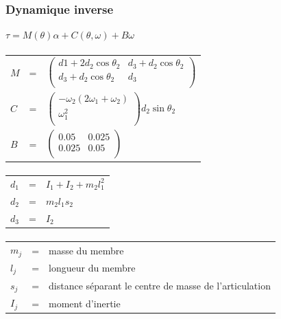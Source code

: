 \documentclass[pdftex,a4paper,11pt]{article}
\begin{document}
\subsubsection{Dynamique inverse}
$\tau = M(\theta)\alpha + C(\theta, \omega) + B\omega $

\paragraph{}
\begin{tabular}{lcl}
    $M$ & = &
    $
    \begin{pmatrix}
        d1 + 2 d_2 \cos\theta_2  & d_3 + d_2 \cos \theta_2 \\
        d_3 + d_2 \cos\theta_2 & d_3 \\
    \end{pmatrix}
    $ \\

    $C$ & = &
    $
    \begin{pmatrix}
        -\omega_2 (2 \omega_1 + \omega_2) \\
        \omega_1^2 \\
    \end{pmatrix}
    d_2 \sin\theta_2
    $\\

    $B$ & = &
    $
    \begin{pmatrix}
        0.05  & 0.025 \\
        0.025 & 0.05 \\
    \end{pmatrix}
    $
\end{tabular}

\paragraph{}
\begin{tabular}{lcl}
    $d_1$ & = & $I_1 + I_2 + m_2 l_1^2$ \\
    $d_2$ & = & $m_2 l_1 s_2$ \\
    $d_3$ & = & $I_2$ \\
\end{tabular}

\paragraph{}
\begin{tabular}{lcl}
    $m_j$ & = & masse du membre \\
    $l_j$ & = & longueur du membre \\
    $s_{j}$ & = & distance séparant le centre de masse de l'articulation \\
    $I_{j}$ & = & moment d'inertie \\
\end{tabular}
\end{document}
